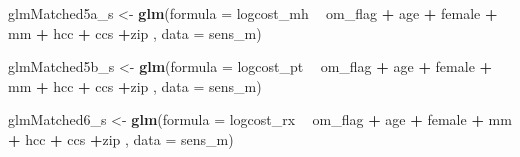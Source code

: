 \documentclass[]{article}
\newenvironment{Shaded}{\begin{snugshade}}{\end{snugshade}}
\newcommand{\KeywordTok}[1]{\textcolor[rgb]{0.13,0.29,0.53}{\textbf{#1}}}
\newcommand{\DataTypeTok}[1]{\textcolor[rgb]{0.13,0.29,0.53}{#1}}
\newcommand{\StringTok}[1]{\textcolor[rgb]{0.31,0.60,0.02}{#1}}
\newcommand{\OperatorTok}[1]{\textcolor[rgb]{0.81,0.36,0.00}{\textbf{#1}}}
\newcommand{\NormalTok}[1]{#1}
\begin{document}
\begin{Shaded}
\begin{Highlighting}[]
\NormalTok{glmMatched5a_s <-}\StringTok{ }\KeywordTok{glm}\NormalTok{(}\DataTypeTok{formula =}\NormalTok{ logcost_mh }\OperatorTok{~}\StringTok{ }\NormalTok{om_flag }\OperatorTok{+}\StringTok{ }\NormalTok{age }\OperatorTok{+}\StringTok{ }\NormalTok{female }\OperatorTok{+}\StringTok{ }\NormalTok{mm }\OperatorTok{+}\StringTok{ }\NormalTok{hcc }\OperatorTok{+}\StringTok{ }\NormalTok{ccs }\OperatorTok{+}\NormalTok{zip ,}
                    \DataTypeTok{data    =}\NormalTok{ sens_m)}


\NormalTok{glmMatched5b_s <-}\StringTok{ }\KeywordTok{glm}\NormalTok{(}\DataTypeTok{formula =}\NormalTok{ logcost_pt }\OperatorTok{~}\StringTok{ }\NormalTok{om_flag }\OperatorTok{+}\StringTok{ }\NormalTok{age }\OperatorTok{+}\StringTok{ }\NormalTok{female }\OperatorTok{+}\StringTok{ }\NormalTok{mm }\OperatorTok{+}\StringTok{ }\NormalTok{hcc }\OperatorTok{+}\StringTok{ }\NormalTok{ccs }\OperatorTok{+}\NormalTok{zip ,}
                    \DataTypeTok{data    =}\NormalTok{ sens_m)}


\NormalTok{glmMatched6_s <-}\StringTok{ }\KeywordTok{glm}\NormalTok{(}\DataTypeTok{formula =}\NormalTok{ logcost_rx }\OperatorTok{~}\StringTok{ }\NormalTok{om_flag }\OperatorTok{+}\StringTok{ }\NormalTok{age }\OperatorTok{+}\StringTok{ }\NormalTok{female }\OperatorTok{+}\StringTok{ }\NormalTok{mm }\OperatorTok{+}\StringTok{ }\NormalTok{hcc }\OperatorTok{+}\StringTok{ }\NormalTok{ccs }\OperatorTok{+}\NormalTok{zip ,}
                   \DataTypeTok{data    =}\NormalTok{ sens_m)}



\end{Highlighting}
\end{Shaded}
\end{document}
